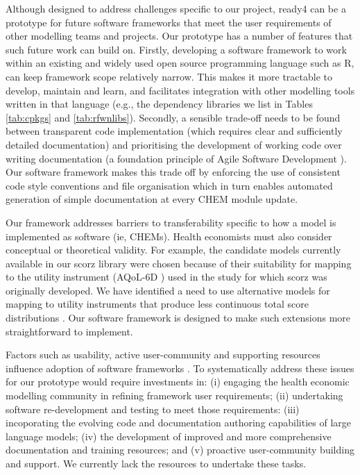 \documentclass[sn-vancouver,Numbered,pdflatex]{sn-jnl}
\theoremstyle{remark}
\theoremstyle{definition}
\begin{document}
Although designed to address challenges specific to our project, ready4 can be a prototype for future software frameworks that meet the user requirements of other modelling teams and projects. Our prototype has a number of features that such future work can build on. Firstly, developing a software framework to work within an existing and widely used open source programming language such as R, can keep framework scope relatively narrow. This makes it more tractable to develop, maintain and learn, and facilitates integration with other modelling tools written in that language (e.g., the dependency libraries we list in Tables \ref{tab:cpkgs} and \ref{tab:rfwnlibs}). Secondly, a sensible trade-off needs to be found between transparent code implementation (which requires clear and sufficiently detailed documentation) and prioritising the development of working code over writing documentation (a foundation principle of Agile Software Development \citep{beck2001manifesto}). Our software framework makes this trade off by enforcing the use of consistent code style conventions and file organisation which in turn enables automated generation of simple documentation at every CHEM module update.

Our framework addresses barriers to transferability specific to how a model is implemented as software (ie, CHEMs). Health economists must also consider conceptual or theoretical validity. For example, the candidate models currently available in our scorz library \citep{hamilton_matthew_2022_6084824} were chosen because of their suitability for mapping to the utility instrument (AQoL-6D \citep{Richardson2012AQ}) used in the study \citep{Hamilton2021.07.07.21260129} for which scorz was originally developed. We have identified a need to use alternative models for mapping to utility instruments that produce less continuous total score distributions \citep{Hamilton2021.07.07.21260129}. Our software framework is designed to make such extensions more straightforward to implement.

Factors such as usability, active user-community and supporting resources influence adoption of software frameworks \citep{myllarniemi2018development}. To systematically address these issues for our prototype would require investments in: (i) engaging the health economic modelling community in refining framework user requirements; (ii) undertaking software re-development and testing to meet those requirements: (iii) incoporating the evolving code and documentation authoring capabilities of large language models; (iv) the development of improved and more comprehensive documentation and training resources; and (v) proactive user-community building and support. We currently lack the resources to undertake these tasks.
\end{document}
